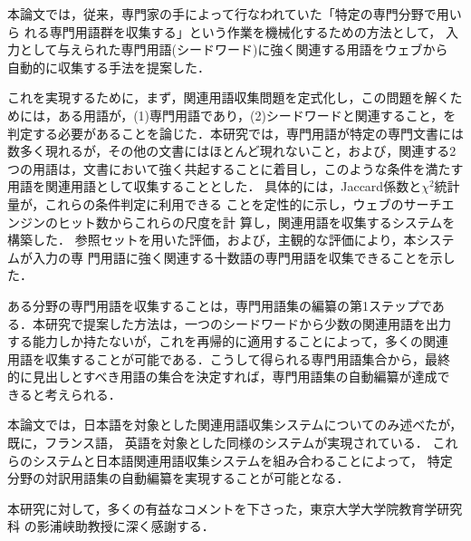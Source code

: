 本論文では，従来，専門家の手によって行なわれていた「特定の専門分野で用いら
れる専門用語群を収集する」という作業を機械化するための方法として，
入力として与えられた専門用語(シードワード)に強く関連する用語をウェブから
自動的に収集する手法を提案した．

これを実現するために，まず，関連用語収集問題を定式化し，この問題を解くた
めには，ある用語が，(1)専門用語であり，(2)シードワードと関連すること，を
判定する必要があることを論じた．本研究では，専門用語が特定の専門文書には
数多く現れるが，その他の文書にはほとんど現れないこと，および，関連する2
つの用語は，文書において強く共起することに着目し，このような条件を満たす
用語を関連用語として収集することとした．
具体的には，Jaccard係数と$\chi^2$統計量が，これらの条件判定に利用できる
ことを定性的に示し，ウェブのサーチエンジンのヒット数からこれらの尺度を計
算し，関連用語を収集するシステムを構築した．
参照セットを用いた評価，および，主観的な評価により，本システムが入力の専
門用語に強く関連する十数語の専門用語を収集できることを示した．

ある分野の専門用語を収集することは，専門用語集の編纂の第1ステップであ
る．本研究で提案した方法は，一つのシードワードから少数の関連用語を出力
する能力しか持たないが，これを再帰的に適用することによって，多くの関連
用語を収集することが可能である．こうして得られる専門用語集合から，最終
的に見出しとすべき用語の集合を決定すれば，専門用語集の自動編纂が達成で
きると考えられる．

本論文では，日本語を対象とした関連用語収集システムについてのみ述べたが，
既に，フランス語，
英語を対象とした同様のシステムが実現されている．
これらのシステムと日本語関連用語収集システムを組み合わることによって，
特定分野の対訳用語集の自動編纂を実現することが可能となる．

\medskip

\acknowledgment

本研究に対して，多くの有益なコメントを下さった，東京大学大学院教育学研究科
の影浦峡助教授に深く感謝する．


